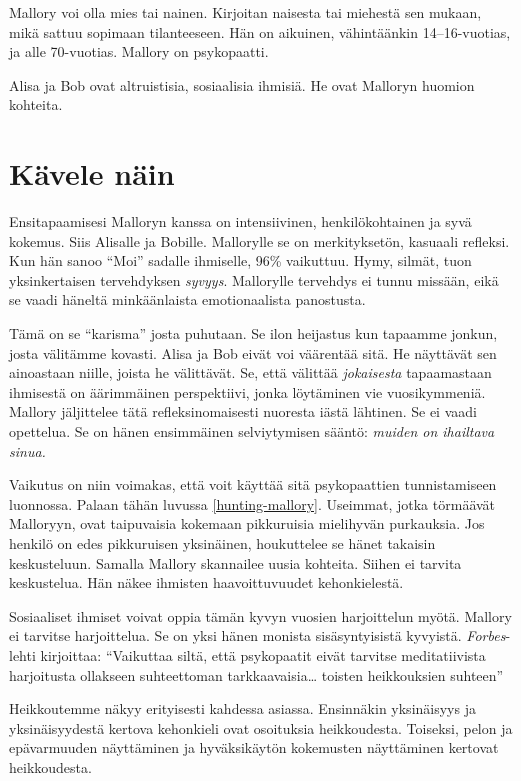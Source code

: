 Mallory voi olla mies tai nainen. Kirjoitan naisesta tai miehestä sen mukaan, mikä sattuu sopimaan tilanteeseen. Hän on aikuinen, vähintäänkin 14--16-vuotias, ja alle 70-vuotias. Mallory on psykopaatti.

Alisa ja Bob ovat altruistisia, sosiaalisia ihmisiä. He ovat Malloryn huomion kohteita.

\section{Kävele näin}

Ensitapaamisesi Malloryn kanssa on intensiivinen, henkilökohtainen ja syvä kokemus. Siis Alisalle ja Bobille. Mallorylle se on merkityksetön, kasuaali refleksi. Kun hän sanoo ``Moi'' sadalle ihmiselle, 96\% vaikuttuu. Hymy, silmät, tuon yksinkertaisen tervehdyksen \emph{syvyys}. Mallorylle tervehdys ei tunnu missään, eikä se vaadi häneltä minkäänlaista emotionaalista panostusta.

Tämä on se ``karisma'' josta puhutaan. Se ilon heijastus kun tapaamme jonkun, josta välitämme kovasti. Alisa ja Bob eivät voi väärentää sitä. He näyttävät sen ainoastaan niille, joista he välittävät. Se, että välittää \emph{jokaisesta} tapaamastaan ihmisestä on äärimmäinen perspektiivi, jonka löytäminen vie vuosikymmeniä. Mallory jäljittelee tätä refleksinomaisesti nuoresta iästä lähtinen. Se ei vaadi opettelua. Se on hänen ensimmäinen selviytymisen sääntö: \emph{muiden on ihailtava sinua.}

Vaikutus on niin voimakas, että voit käyttää sitä psykopaattien tunnistamiseen luonnossa. Palaan tähän luvussa \ref{hunting-mallory}. Useimmat, jotka törmäävät Malloryyn, ovat taipuvaisia kokemaan pikkuruisia mielihyvän purkauksia. Jos henkilö on edes pikkuruisen yksinäinen, houkuttelee se hänet takaisin keskusteluun. Samalla Mallory skannailee uusia kohteita. Siihen ei tarvita keskustelua. Hän näkee ihmisten haavoittuvuudet kehonkielestä.

Sosiaaliset ihmiset voivat oppia tämän kyvyn vuosien harjoittelun myötä. Mallory ei tarvitse harjoittelua. Se on yksi hänen monista sisäsyntyisistä kyvyistä. \emph{Forbes}-lehti kirjoittaa: ``Vaikuttaa siltä, että psykopaatit eivät tarvitse meditatiivista harjoitusta ollakseen suhteettoman tarkkaavaisia{\ldots} toisten heikkouksien suhteen''

Heikkoutemme näkyy erityisesti kahdessa asiassa. Ensinnäkin yksinäisyys ja yksinäisyydestä kertova kehonkieli ovat osoituksia heikkoudesta. Toiseksi, pelon ja epävarmuuden näyttäminen ja hyväksikäytön kokemusten näyttäminen kertovat heikkoudesta.

